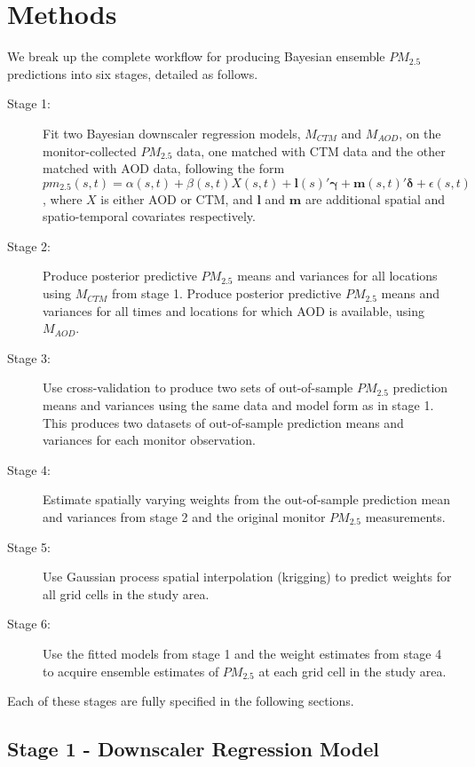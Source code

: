 \documentclass[12pt]{article}
\newcommand{\bs}{\boldsymbol}
\begin{document}
\section*{Methods}

We break up the complete workflow for producing Bayesian ensemble $PM_{2.5}$ predictions into six stages, detailed as follows. 

\begin{description}
    \item[Stage 1:] Fit two Bayesian downscaler regression models, $M_{CTM}$ and $M_{AOD}$, on the monitor-collected $PM_{2.5}$ data, one matched with CTM data and the other matched with AOD data, following the form $pm_{2.5}(s,t) = \alpha(s, t) + \beta(s, t) X(s, t) + \mathbf{l}(s)' \bs{\gamma} +  \mathbf{m}(s, t)' \boldsymbol{\delta} + \epsilon(s, t)$, where $X$ is either AOD or CTM, and $\mathbf{l}$ and $\mathbf{m}$ are additional spatial and spatio-temporal covariates respectively. 
    \item[Stage 2:] Produce posterior predictive $PM_{2.5}$ means and variances for all locations using $M_{CTM}$ from stage 1. Produce posterior predictive $PM_{2.5}$ means and variances for all times and locations for which AOD is available, using $M_{AOD}$. 
    \item[Stage 3:] Use cross-validation to produce two sets of out-of-sample $PM_{2.5}$ prediction means and variances using the same data and model form as in stage 1. This produces two datasets of out-of-sample prediction means and variances for each monitor observation.
    \item[Stage 4:] Estimate spatially varying weights from the out-of-sample prediction mean and variances from stage 2 and the original monitor $PM_{2.5}$ measurements. 
    \item[Stage 5:] Use Gaussian process spatial interpolation (krigging) to predict weights for all grid cells in the study area. 
    \item[Stage 6:] Use the fitted models from stage 1 and the weight estimates from stage 4 to acquire ensemble estimates of $PM_{2.5}$ at each grid cell in the study area. 
\end{description}

\noindent Each of these stages are fully specified in the following sections.

\subsection*{Stage 1 - Downscaler Regression Model}
\end{document}
